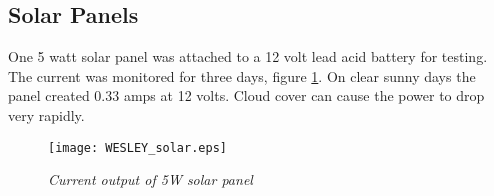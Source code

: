 \subsection{Solar Panels}

One 5 watt solar panel was attached to a 12 volt lead acid battery for testing. The current was monitored for three days, figure \ref{fig:solar}. On clear sunny days the panel created 0.33 amps at 12 volts. Cloud cover can cause the power to drop very rapidly. 

\begin{figure}
\centering
\texttt{[image: WESLEY\_solar.eps]}
\caption{\textit{Current output of 5W solar panel}}
\label{fig:solar}
\end{figure}